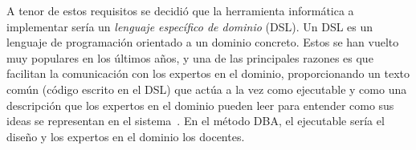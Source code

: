 A tenor de estos requisitos se decidió que la herramienta informática a implementar sería un \emph{lenguaje específico de dominio} (DSL). Un DSL es un lenguaje de programación orientado a un dominio concreto. Estos se han vuelto muy populares en los últimos años, y una de las principales razones es que facilitan la comunicación con los expertos en el dominio, proporcionando un texto común (código escrito en el DSL) que actúa a la vez como ejecutable y como una descripción que los expertos en el dominio pueden leer para entender como sus ideas se representan en el sistema~\cite{fowler2010domain}. En el método DBA, el ejecutable sería el diseño y los expertos en el dominio los docentes.








 











